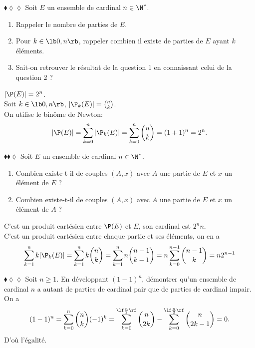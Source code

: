 \documentclass[11pt]{article}
\begin{document}
\begin{exercice}{$\blacklozenge\lozenge\lozenge$}{}
    Soit $E$ un ensemble de cardinal $n\in\N^*$.
    \begin{enumerate}
        \item Rappeler le nombre de parties de $E$.
        \item Pour $k\in\lb0,n\rb$, rappeler combien il existe de parties de $E$ ayant $k$ éléments.
        \item Sait-on retrouver le résultat de la question 1 en connaissant celui de la question 2 ?
    \end{enumerate}
    \tcblower
     $|\P(E)|=2^n$.\\
     Soit $k\in\lb0,n\rb$, $|\P_k(E)|=\binom{n}{k}$.\\
     On utilise le binôme de Newton:
    \begin{equation*}
        |\P(E)|=\sum_{k=0}^n|\P_k(E)|=\sum_{k=0}^n\binom{n}{k}=(1+1)^n=2^n.
    \end{equation*}
\end{exercice}

\begin{exercice}{$\blacklozenge\blacklozenge\lozenge$}{}
    Soit $E$ un ensemble de cardinal $n\in\N^*$.
    \begin{enumerate}
        \item Combien existe-t-il de couples $(A,x)$ avec $A$ une partie de $E$ et $x$ un élément de $E$ ?
        \item Combien existe-t-il de couples $(A,x)$ avec $A$ une partie de $E$ et $x$ un élément de $A$ ?
    \end{enumerate}
    \tcblower
     C'est un produit cartésien entre $\P(E)$ et $E$, son cardinal est $2^nn$.\\
     C'est un produit cartésien entre chaque partie et ses éléments, on en a
    \begin{equation*}
        \sum_{k=1}^nk|\P_k(E)|=\sum_{k=1}^nk\binom{n}{k}=\sum_{k=1}^nn\binom{n-1}{k-1}=n\sum_{k=0}^{n-1}\binom{n-1}{k}=n2^{n-1}
    \end{equation*}
\end{exercice}

\begin{exercice}{$\blacklozenge\lozenge\lozenge$}{}
    Soit $n\geq1$. En développant $(1-1)^n$, démontrer qu'un ensemble de cardinal $n$ a autant de parties de cardinal pair que de parties de cardinal impair.
    \tcblower
    On a
    \begin{equation*}
        (1-1)^n=\sum_{k=0}^n\binom{n}{k}(-1)^k=\sum_{k=0}^{\lf\frac{n}{2}\rf}\binom{n}{2k}-\sum_{k=0}^{\lf\frac{n}{2}\rf}\binom{n}{2k-1}=0.
    \end{equation*}
    D'où l'égalité.
\end{exercice}
\end{document}
